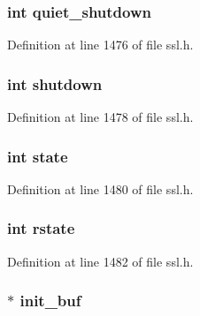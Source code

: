 \subsubsection[{\texorpdfstring{quiet\+\_\+shutdown}{quiet_shutdown}}]{\setlength{\rightskip}{0pt plus 5cm}int quiet\+\_\+shutdown}\hypertarget{structssl__st_aa8eaa5b8fc4a19fa46dcac8863276b40}{}\label{structssl__st_aa8eaa5b8fc4a19fa46dcac8863276b40}


Definition at line 1476 of file ssl.\+h.

\subsubsection[{\texorpdfstring{shutdown}{shutdown}}]{\setlength{\rightskip}{0pt plus 5cm}int shutdown}\hypertarget{structssl__st_a5161d377a61befc3f8103e794d5cb582}{}\label{structssl__st_a5161d377a61befc3f8103e794d5cb582}


Definition at line 1478 of file ssl.\+h.

\subsubsection[{\texorpdfstring{state}{state}}]{\setlength{\rightskip}{0pt plus 5cm}int state}\hypertarget{structssl__st_a89f234133d3efe315836311cbf21c64b}{}\label{structssl__st_a89f234133d3efe315836311cbf21c64b}


Definition at line 1480 of file ssl.\+h.

\subsubsection[{\texorpdfstring{rstate}{rstate}}]{\setlength{\rightskip}{0pt plus 5cm}int rstate}\hypertarget{structssl__st_a2d7e02860edd1252fbd8cfb88749f364}{}\label{structssl__st_a2d7e02860edd1252fbd8cfb88749f364}


Definition at line 1482 of file ssl.\+h.

\subsubsection[{\texorpdfstring{init\+\_\+buf}{init_buf}}]{ $\ast$ init\+\_\+buf}\hypertarget{structssl__st_af250aa342a4f3cd387094731a314ed9d}{}\label{structssl__st_af250aa342a4f3cd387094731a314ed9d}



